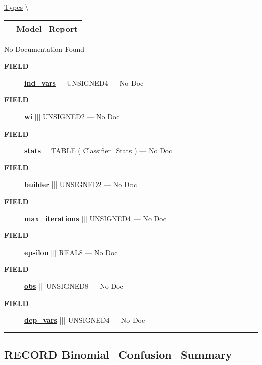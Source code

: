 \hypertarget{ecldoc:logisticregression.types.model_report}{}
\hspace{0pt} \hyperlink{ecldoc:LogisticRegression.Types}{Types} \textbackslash 

{\renewcommand{\arraystretch}{1.5}
\begin{tabularx}{\textwidth}{|>{\raggedright\arraybackslash}l|X|}
\hline
\hspace{0pt}\mytexttt{\color{red} } & \textbf{Model\_Report} \\
\hline
\end{tabularx}
}

\par





No Documentation Found







\par
\begin{description}
\item [\colorbox{tagtype}{\color{white} \textbf{\textsf{FIELD}}}] \textbf{\underline{ind\_vars}} ||| UNSIGNED4 --- No Doc
\item [\colorbox{tagtype}{\color{white} \textbf{\textsf{FIELD}}}] \textbf{\underline{wi}} ||| UNSIGNED2 --- No Doc
\item [\colorbox{tagtype}{\color{white} \textbf{\textsf{FIELD}}}] \textbf{\underline{stats}} ||| TABLE ( Classifier\_Stats ) --- No Doc
\item [\colorbox{tagtype}{\color{white} \textbf{\textsf{FIELD}}}] \textbf{\underline{builder}} ||| UNSIGNED2 --- No Doc
\item [\colorbox{tagtype}{\color{white} \textbf{\textsf{FIELD}}}] \textbf{\underline{max\_iterations}} ||| UNSIGNED4 --- No Doc
\item [\colorbox{tagtype}{\color{white} \textbf{\textsf{FIELD}}}] \textbf{\underline{epsilon}} ||| REAL8 --- No Doc
\item [\colorbox{tagtype}{\color{white} \textbf{\textsf{FIELD}}}] \textbf{\underline{obs}} ||| UNSIGNED8 --- No Doc
\item [\colorbox{tagtype}{\color{white} \textbf{\textsf{FIELD}}}] \textbf{\underline{dep\_vars}} ||| UNSIGNED4 --- No Doc
\end{description}





\rule{\linewidth}{0.5pt}
\subsection*{\textsf{\colorbox{headtoc}{\color{white} RECORD}
Binomial\_Confusion\_Summary}}

